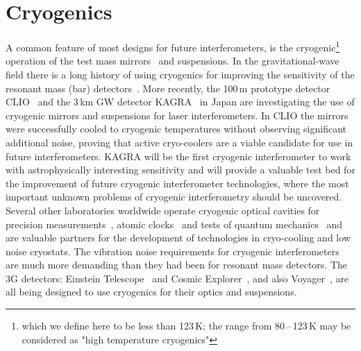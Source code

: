 \chapter{Cryogenics}
\label{sec:Cryogenics}
\vspace{-4cm} %


A common feature of most designs for future interferometers, is the cryogenic\footnote{which we define here to be less than 123\,K; the range from 80\,--\,123\,K may be considered as "high temperature cryogenics"} operation of the test mass mirrors~\cite{ET2011, ISWP:2018} and suspensions. In the gravitational-wave field there is a long history of using cryogenics for improving the sensitivity of the resonant mass (bar) detectors~\cite{ColdBars}. 
More recently, the 100\,m prototype detector CLIO~\cite{CLIO:2008} and the 3\,km GW detector KAGRA~\cite{KAGRA2013} in Japan are investigating the use of cryogenic mirrors and suspensions for laser interferometers.
In CLIO the mirrors were successfully cooled to cryogenic temperatures without observing significant additional noise, proving that active cryo-coolers are a viable candidate for use in future interferometers. KAGRA will be the first cryogenic interferometer to work with astrophysically interesting sensitivity and will provide a valuable test bed for the improvement of future cryogenic interferometer technologies, where the most important unknown problems of cryogenic interferometry should be uncovered. Several other laboratories worldwide operate cryogenic optical cavities for precision measurements~\cite{Holger:Munich}, atomic clocks~\cite{JunYegroup} and tests of quantum mechanics~\cite{CaltechIQIM} and are valuable partners for the development of technologies in cryo-cooling and low noise cryostats. The vibration noise requirements for cryogenic interferometers are much more demanding than they had been for resonant mass detectors.
The 3G detectors: Einstein Telescope~\cite{Sathyaprakash:2012jt} and Cosmic Explorer~\cite{CosmicExplorer2017}, and also Voyager~\cite{Voyager:Inst}, are all being designed to use cryogenics for their optics and suspensions.

